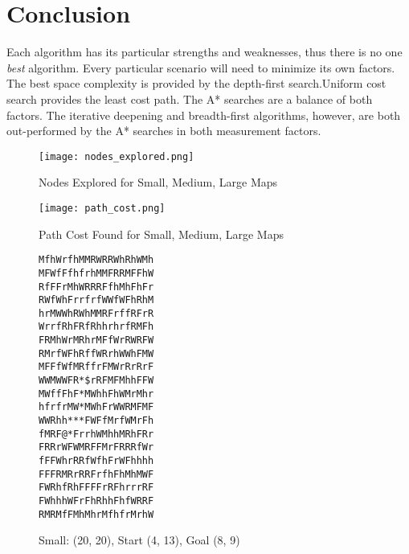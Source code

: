 \documentclass[12pt, article]{scrartcl}
\begin{document}
\section{Conclusion}
Each algorithm has its particular strengths and weaknesses, thus there is no one \emph{best} algorithm. Every particular scenario will need to minimize its own factors. The best space complexity is provided by the depth-first search.Uniform cost search provides the least cost path. The A* searches are a balance of both factors. The iterative deepening and breadth-first algorithms, however, are both out-performed by the A* searches in both measurement factors.

\begin{figure}[p]
\centering
\caption{Nodes Explored for Small, Medium, Large Maps}
\texttt{[image: nodes\_explored.png]}
\end{figure}
\begin{figure}[p]
\centering
\caption{Path Cost Found for Small, Medium, Large Maps}
\texttt{[image: path\_cost.png]}
\end{figure}
\begin{figure}[p]
\caption{Small: (20, 20), Start (4, 13), Goal (8, 9)}
\begin{verbatim}
MfhWrfhMMRWRRWhRhWMh
MFWfFfhfrhMMFRRMFFhW
RfFFrMhWRRRFfhMhFhFr
RWfWhFrrfrfWWfWFhRhM
hrMWWhRWhMMRFrffRFrR
WrrfRhFRfRhhrhrfRMFh
FRMhWrMRhrMFfWrRWRFW
RMrfWFhRffWRrhWWhFMW
MFFfWfMRffrFMWrRrRrF
WWMWWFR*$rRFMFMhhFFW
MWffFhF*MWhhFhWMrMhr
hfrfrMW*MWhFrWWRMFMF
WWRhh***FWFfMrfWMrFh
fMRF@*FrrhWMhhMRhFRr
FRRrWFWMRFFMrFRRRfWr
fFFWhrRRfWfhFrWFhhhh
FFFRMRrRRFrfhFhMhMWF
FWRhfRhFFFFrRFhrrrRF
FWhhhWFrFhRhhFhfWRRF
RMRMfFMhMhrMfhfrMrhW
\end{verbatim}
\end{figure}
\end{document}
